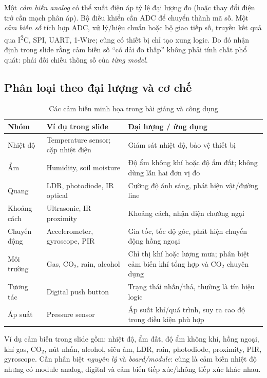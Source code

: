 Một \emph{cảm biến analog} có thể xuất điện áp tỷ lệ đại lượng đo (hoặc thay đổi điện trở cần mạch phân áp). Bộ điều khiển cần ADC để chuyển thành mã số. Một \emph{cảm biến số} tích hợp ADC, xử lý/hiệu chuẩn hoặc bộ giao tiếp số, truyền kết quả qua I\textsuperscript{2}C, SPI, UART, 1-Wire; cũng có thiết bị chỉ tạo xung logic. Do đó nhận định trong slide rằng cảm biến số ``có dải đo thấp'' không phải tính chất phổ quát: phải đối chiếu thông số của \emph{từng model}.

\subsection{Phân loại theo đại lượng và cơ chế}
\begin{table}[htbp]\centering\footnotesize
\caption{Các cảm biến minh họa trong bài giảng và công dụng}
\begin{tabularx}{\textwidth}{p{32mm}p{40mm}X}
\toprule
Nhóm & Ví dụ trong slide & Đại lượng / ứng dụng\\\midrule
Nhiệt độ & Temperature sensor; cặp nhiệt điện & Giám sát nhiệt độ, bảo vệ thiết bị\\
Ẩm & Humidity, soil moisture & Độ ẩm không khí hoặc độ ẩm đất; không dùng lẫn hai đơn vị đo\\
Quang & LDR, photodiode, IR optical & Cường độ ánh sáng, phát hiện vật/đường line\\
Khoảng cách & Ultrasonic, IR proximity & Khoảng cách, nhận diện chướng ngại\\
Chuyển động & Accelerometer, gyroscope, PIR & Gia tốc, tốc độ góc, phát hiện chuyển động hồng ngoại\\
Môi trường & Gas, CO$_2$, rain, alcohol & Chỉ thị khí hoặc lượng mưa; phân biệt cảm biến khí tổng hợp và CO$_2$ chuyên dụng\\
Tương tác & Digital push button & Trạng thái nhấn/thả, thường là tín hiệu logic\\
Áp suất & Pressure sensor & Áp suất khí/quá trình, suy ra cao độ trong điều kiện phù hợp\\\bottomrule
\end{tabularx}
\end{table}

Ví dụ cảm biến trong slide gồm: nhiệt độ, ẩm đất, độ ẩm không khí, hồng ngoại, khí gas, CO$_2$, nút nhấn, alcohol, siêu âm, LDR, rain, photodiode, proximity, PIR, gyroscope. Cần phân biệt \emph{nguyên lý} và \emph{board/module}: cùng là cảm biến nhiệt độ nhưng có module analog, digital và cảm biến tiếp xúc/không tiếp xúc khác nhau.

